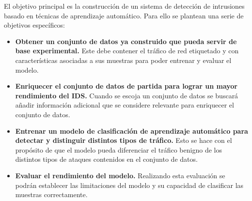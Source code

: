 El objetivo principal es la construcción de un sistema de detección de intrusiones basado en técnicas de aprendizaje automático. Para ello se plantean una serie de objetivos específicos:

\begin{itemize}
\item {\normalsize \textbf{Obtener un conjunto de datos ya construido que pueda servir de base experimental.} Este debe contener el tráfico de red etiquetado y con características asociadas a sus muestras para poder entrenar y evaluar el modelo.}

\item {\normalsize \textbf{Enriquecer el conjunto de datos de partida para lograr un mayor rendimiento del IDS.} Cuando se escoja un conjunto de datos se buscará añadir información adicional que se considere relevante para enriquecer el conjunto de datos.}

\item {\normalsize \textbf{Entrenar un modelo de clasificación de aprendizaje automático para detectar y distinguir distintos tipos de tráfico.} Esto se hace con el propósito de que el modelo pueda diferenciar el tráfico benigno de los distintos tipos de ataques contenidos en el conjunto de datos.}

\item {\normalsize \textbf{Evaluar el rendimiento del modelo.} Realizando esta evaluación se podrán establecer las limitaciones del modelo y su capacidad de clasificar las muestras correctamente.}

\end{itemize}